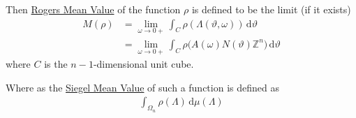\documentclass[11pt]{article}
\theoremstyle{definition}
\theoremstyle{proof}
\begin{document}
Then \uline{Rogers Mean Value} of the function $\rho$ is defined to be the limit (if it exists)
\begin{equation}\label{rmv}
    \begin{split}
        M(\rho ) &= \lim_{\omega \to 0+} \int_{C} \rho (\Lambda (\vartheta , \omega )) \, \mathrm{d} \vartheta \\
        &= \lim_{\omega \to 0+} \int_{C} \rho \big(A(\omega ) N(\vartheta ) \mathbb{Z}^{n}\big) \, \mathrm{d} \vartheta 
    \end{split}
\end{equation}
where $C$ is the $n-1$-dimensional unit cube.

Where as the \uline{Siegel Mean Value} of such a function is defined as
\begin{equation}\label{smv}
    \begin{split}
        \int_{{\Omega}_n} \rho (\Lambda ) \, \mathrm{d} \mu (\Lambda )
    \end{split}
\end{equation}
\end{document}
